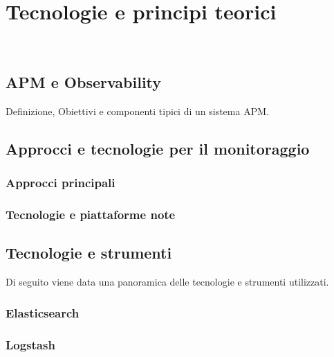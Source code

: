 \chapter{Tecnologie e principi teorici}
\label{cap:tecnologie-principi-teorici}

\\

\section{APM e Observability}
\label{sec:apm-observability}
Definizione, Obiettivi e componenti tipici di un sistema APM.


\section{Approcci e tecnologie per il monitoraggio}
\label{sec:approcci-tecnologie-monitoraggio}

\subsection{Approcci principali}


\subsection{Tecnologie e piattaforme note}


\section{Tecnologie e strumenti}
\label{sec:tecnologie-strumenti}
Di seguito viene data una panoramica delle tecnologie e strumenti utilizzati.

\subsection*{Elasticsearch}

\subsection*{Logstash}

